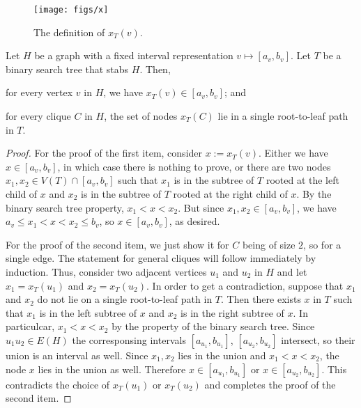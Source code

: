 \documentclass[kpfonts]{patmorin}
\let\le\leqslant
\begin{document}
\begin{figure}
  \begin{center}
    \texttt{[image: figs/x]}
  \end{center}
  \caption{The definition of $x_T(v)$.}
\end{figure}


\begin{lem}
Let $H$ be a graph with a fixed interval representation $v\mapsto[a_v,b_v]$. 
Let $T$ be a binary search tree that stabs $H$. 
Then,
\begin{compactenum}
  \item for every vertex $v$ in $H$, we have $x_{T}(v) \in [a_v,b_v]$; and
  \label{itm:v-in-its-interval}
  \item for every clique $C$ in $H$, the set of nodes $x_T(C)$ lie in a single root-to-leaf path in $T$.
  \label{itm:clique-on-a-single-path}
\end{compactenum}
\end{lem}
\begin{proof}
  For the proof of the first item, consider $x:=x_T(v)$.
  Either we have $x\in [a_v,b_v]$, in which case there is nothing to prove, 
  or there are two nodes $x_1,x_2\in V(T)\cap[a_v,b_v]$ such that $x_1$ is in the subtree of $T$ rooted at the left child of $x$ and $x_2$ is in the subtree of $T$ rooted at the right child of $x$.  
  By the binary search tree property, $x_1<x<x_2$. 
  But since $x_1,x_2 \in [a_v,b_v]$, we have $a_v\le x_1<x<x_2\le b_v$, so $x\in [a_v,b_v]$, as desired.

  For the proof of the second item, we just show it for $C$ being of size $2$, so for a single edge. 
  The statement for general cliques will follow immediately by induction.
  Thus, consider two adjacent vertices $u_1$ and $u_2$ in $H$ and 
  let $x_1=x_T(u_1)$ and $x_2=x_T(u_2)$.
  In order to get a contradiction, suppose that $x_1$ and $x_2$ do not lie on a single root-to-leaf path in $T$. 
  Then there exists $x$ in $T$ such that $x_1$ is in the left subtree of $x$ and $x_2$ is in the right subtree of $x$.
  In particulcar, $x_1 < x < x_2$ by the property of the binary search tree.
  Since $u_1u_2 \in E(H)$ the corresponsing intervals $[a_{u_1},b_{u_1}]$, $[a_{u_2}, b_{u_2}]$ intersect, so their union is an interval as well. 
  Since $x_1,x_2$ lies in the union and $x_1 < x < x_2$, the node $x$ lies in the union as well.
  Therefore $x\in[a_{u_1},b_{u_1}]$ or $x\in [a_{u_2}, b_{u_2}]$. 
  This contradicts the choice of $x_T(u_1)$ or $x_T(u_2)$ and completes the proof of the second item.
\end{proof}
\end{document}
